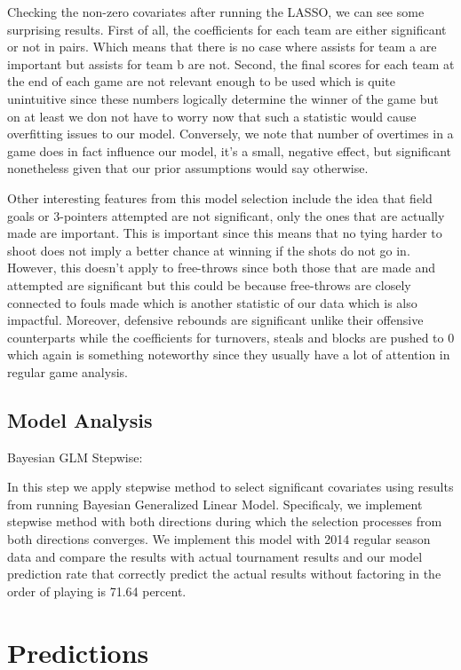 \documentclass{article} %
\begin{document}
Checking the non-zero covariates after running the LASSO, we can see some surprising results. 
First of all, the coefficients for each team are either significant or not in pairs. Which means that there is no case where assists for team a are important but assists for team b are not. Second, the final scores for each team at the end of each game are not relevant enough to be used which is quite unintuitive since these numbers logically determine the winner of the game but on at least we don not have to worry now that such a statistic would cause overfitting issues to our model. Conversely, we note that number of overtimes in a game does in fact influence our model, it's a small, negative effect, but significant nonetheless given that our prior assumptions would say otherwise. \

Other interesting features from this model selection include the idea that field goals or 3-pointers attempted are not significant, only the ones that are actually made are important. This is important since this means that no tying harder to shoot does not imply a better chance at winning if the shots do not go in. However, this doesn't apply to free-throws since both those that are made and attempted are significant but this could be because free-throws are closely connected to fouls made which is another statistic of our data which is also impactful. Moreover, defensive rebounds are significant unlike their offensive counterparts while the coefficients for turnovers, steals and blocks are pushed to 0 which again is something noteworthy since they usually have a lot of attention in regular game analysis.\

\subsection{Model Analysis}

Bayesian GLM Stepwise:

In this step we apply stepwise method to select significant covariates using results from running Bayesian Generalized Linear Model. Specificaly, we implement stepwise method with both directions during which the selection processes from both directions converges. We implement this model with 2014 regular season data and compare the results with actual tournament results and our model prediction rate that correctly predict the actual results without factoring in the order of playing is 71.64 percent.\


\section{Predictions}
\end{document}
